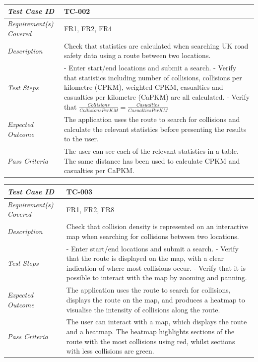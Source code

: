 \documentclass[authoryearcitations]{UoYCSproject}
\begin{document}
\begin{tabular}{| p{2.5cm} | p{11cm} |}
	\hline
	\textit{Test Case ID} & TC-002 \\ \hline
	\textit{Requirement(s) Covered} & FR1, FR2, FR4 \\ \hline
	\textit{Description} & Check that statistics are calculated when searching UK road safety data using a route between two locations.  \\ \hline
	\textit{Test Steps}& - Enter start/end locations and submit a search.
	\newline - Verify that statistics including number of collisions, collisions per kilometre (CPKM), weighted CPKM, casualties and casualties per kilometre (CaPKM) are all calculated.
	\newline - Verify that $\frac{Collisions}{Collisions Per KM} = \frac{Casualties}{Casualties Per KM} $
 \\ \hline
	\textit{Expected Outcome} & The application uses the route to search for collisions and calculate the relevant statistics before presenting the results to the user.  \\ \hline
	\textit{Pass Criteria} & The user can see each of the relevant statistics in a table. The same distance has been used to calculate CPKM and casualties per CaPKM. \\ \hline
\end{tabular}


\begin{tabular}{| p{2.5cm} | p{11cm} |}
	\hline
	\textit{Test Case ID} & TC-003 \\ \hline
	\textit{Requirement(s) Covered} & FR1, FR2, FR8 \\ \hline
	\textit{Description} & Check that collision density is represented on an interactive map when searching for collisions between two locations.  \\ \hline
	\textit{Test Steps}& - Enter start/end locations and submit a search.
	\newline - Verify that the route is displayed on the map, with a clear indication of where most collisions occur.
	\newline - Verify that it is possible to interact with the map by zooming and panning. 
 \\ \hline
	\textit{Expected Outcome} & The application uses the route to search for collisions, displays the route on the map, and produces a heatmap to visualise the intensity of collisions along the route.  \\ \hline
	\textit{Pass Criteria} & The user can interact with a map, which displays the route and a heatmap. The heatmap highlights sections of the route with the most collisions using red, whilst sections with less collisions are green.  \\ \hline
\end{tabular}
\end{document}
